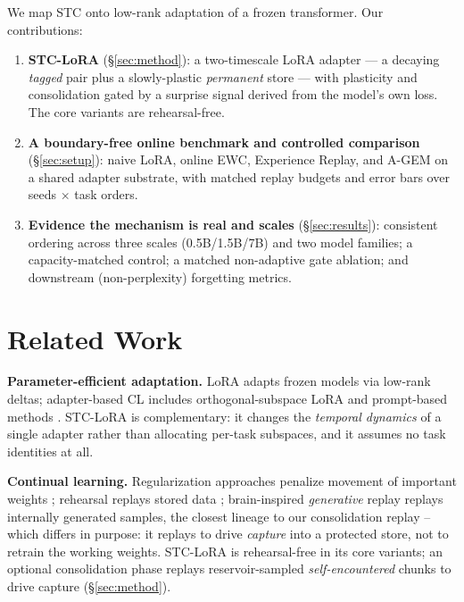 \documentclass{article}
\newcommand{\stc}{STC-LoRA}
\begin{document}
We map STC onto low-rank adaptation \citep{hu2022lora} of a frozen transformer. Our contributions:
\begin{enumerate}
  \item \textbf{\stc{}} (\S\ref{sec:method}): a two-timescale LoRA adapter --- a decaying \emph{tagged} pair plus a slowly-plastic \emph{permanent} store --- with plasticity and consolidation gated by a surprise signal derived from the model's own loss. The core variants are rehearsal-free.
  \item \textbf{A boundary-free online benchmark and controlled comparison} (\S\ref{sec:setup}): naive LoRA, online EWC, Experience Replay, and A-GEM on a shared adapter substrate, with matched replay budgets and error bars over seeds $\times$ task orders.
  \item \textbf{Evidence the mechanism is real and scales} (\S\ref{sec:results}): consistent ordering across three scales (0.5B/1.5B/7B) and two model families; a capacity-matched control; a matched non-adaptive gate ablation; and downstream (non-perplexity) forgetting metrics.
\end{enumerate}

\section{Related Work}
\textbf{Parameter-efficient adaptation.} LoRA \citep{hu2022lora} adapts frozen models via low-rank deltas; adapter-based CL includes orthogonal-subspace LoRA \citep{wang2023orthogonal} and prompt-based methods \citep{wang2022learning}. \stc{} is complementary: it changes the \emph{temporal dynamics} of a single adapter rather than allocating per-task subspaces, and it assumes no task identities at all.

\textbf{Continual learning.} Regularization approaches penalize movement of important weights \citep{kirkpatrick2017overcoming,zenke2017continual,schwarz2018progress}; rehearsal replays stored data \citep{rolnick2019experience,lopez2017gradient,chaudhry2019efficient}; brain-inspired \emph{generative} replay \citep{vandeven2020brain} replays internally generated samples, the closest lineage to our consolidation replay -- which differs in purpose: it replays to drive \emph{capture} into a protected store, not to retrain the working weights. \stc{} is rehearsal-free in its core variants; an optional consolidation phase replays reservoir-sampled \citep{vitter1985random} \emph{self-encountered} chunks to drive capture (\S\ref{sec:method}).
\end{document}
